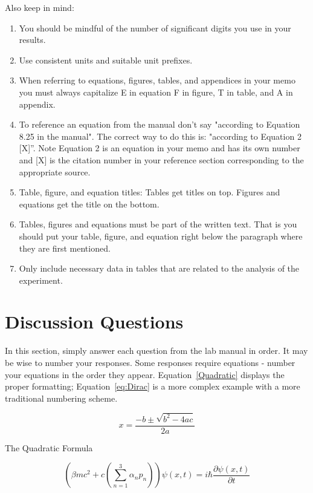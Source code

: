 \documentclass[11pt,letter]{report}
\begin{document}
Also keep in mind:

\begin{enumerate} %
  \item You should be mindful of the number of significant digits you use in your results.
  \item Use consistent units and suitable unit prefixes.
  \item When referring to equations, figures, tables, and appendices in your memo you must always capitalize E in equation F in figure, T in table, and A in appendix.
  \item To reference an equation from the manual don't say "according to Equation 8.25 in the manual". The correct way to do this is: "according to Equation 2 [X]”. Note Equation 2 is an equation in your memo and has its own number and [X] is the citation number in your reference section corresponding to the appropriate source.
  \item Table, figure, and equation titles: Tables get titles on top. Figures and equations get the title on the bottom.
  \item Tables, figures and equations must be part of the written text. That is you should put your table, figure, and equation right below the paragraph where they are first mentioned.
  \item Only include necessary data in tables that are related to the analysis of the experiment.
\end{enumerate}

\section*{Discussion Questions}
In this section, simply answer each question from the lab manual in order. It may be wise to number your responses. Some responses require equations - number your equations in the order they appear. Equation~\ref{Quadratic} displays the proper formatting; Equation~\ref{eq:Dirac} is a more complex example with a more traditional numbering scheme.

\begin{eqfloat}[!htb]
	\begin{equation*}
		x=\frac{-b\pm\sqrt{b^2-4ac}}{2a}
	\end{equation*}
\caption{The Quadratic Formula}
\label{Quadratic}
\end{eqfloat}
	
\begin{equation}
	\label{eq:Dirac}
	\left (
  \beta mc^2 + c 
     \left ( 
         \sum_{n=1}^3 \alpha_n p_n 
     \right )
	\right )
	\psi(x,t)
	=
	i \hbar \dfrac{\partial \psi(x,t) }{\partial t}
\end{equation}
\end{document}
